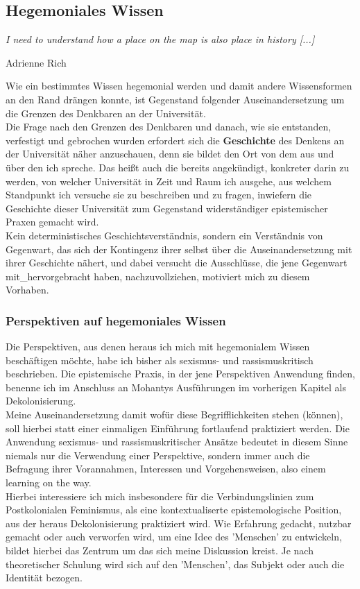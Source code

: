 \subsection{Hegemoniales Wissen}
\epigraph{\textit{ 
I need to understand how a place on the map is also place in history [...]
}}{Adrienne Rich \footnotemark}  

Wie ein bestimmtes Wissen hegemonial werden und damit andere Wissensformen an
den Rand drängen konnte, ist Gegenstand folgender Auseinandersetzung um die
Grenzen des Denkbaren an der Universität.\\
Die Frage nach den Grenzen des
Denkbaren und danach, wie sie entstanden, verfestigt und gebrochen wurden
erfordert sich die \textbf{Geschichte} des Denkens an der Universität näher anzuschauen,
denn sie bildet den Ort von dem aus und über den ich spreche. Das heißt auch
die bereits angekündigt, konkreter darin zu werden, von welcher Universität in
Zeit und Raum ich ausgehe, aus welchem Standpunkt ich versuche sie zu
beschreiben und zu fragen, inwiefern die Geschichte dieser Universität zum
Gegenstand widerständiger epistemischer Praxen gemacht wird.\\
Kein
deterministisches Geschichtsverständnis, sondern ein Verständnis von Gegenwart,
das sich der Kontingenz ihrer selbst über die Auseinandersetzung mit ihrer
Geschichte nähert, und dabei versucht die Ausschlüsse, die jene Gegenwart
mit\_hervorgebracht haben, nachzuvollziehen, motiviert mich zu diesem Vorhaben. 
\subsubsection{Perspektiven auf hegemoniales Wissen}

Die Perspektiven, aus denen heraus ich mich mit  hegemonialem Wissen
beschäftigen möchte, habe ich bisher als sexismus- und rassismuskritisch
beschrieben. Die epistemische Praxis, in der jene Perspektiven Anwendung
finden,  benenne ich im Anschluss an Mohantys Ausführungen im vorherigen
Kapitel als Dekolonisierung.\\
Meine Auseinandersetzung damit wofür diese
Begrifflichkeiten stehen (können), soll hierbei statt einer einmaligen
Einführung fortlaufend praktiziert werden. Die Anwendung sexismus- und
rassismuskritischer Ansätze bedeutet in diesem Sinne niemals nur die Verwendung
einer Perspektive, sondern immer auch die Befragung ihrer Vorannahmen,
Interessen und Vorgehensweisen, also einem learning on the way. \\
Hierbei
interessiere ich mich insbesondere für die Verbindungslinien zum Postkolonialen
Feminismus, als eine kontextualiserte epistemologische Position, aus der heraus
Dekolonisierung praktiziert wird. Wie Erfahrung gedacht, nutzbar gemacht oder
auch verworfen wird, um eine Idee des 'Menschen' zu entwickeln, bildet hierbei
das Zentrum um das sich meine Diskussion kreist. Je nach theoretischer Schulung
wird sich auf den 'Menschen', das Subjekt oder auch die Identität bezogen.\\

